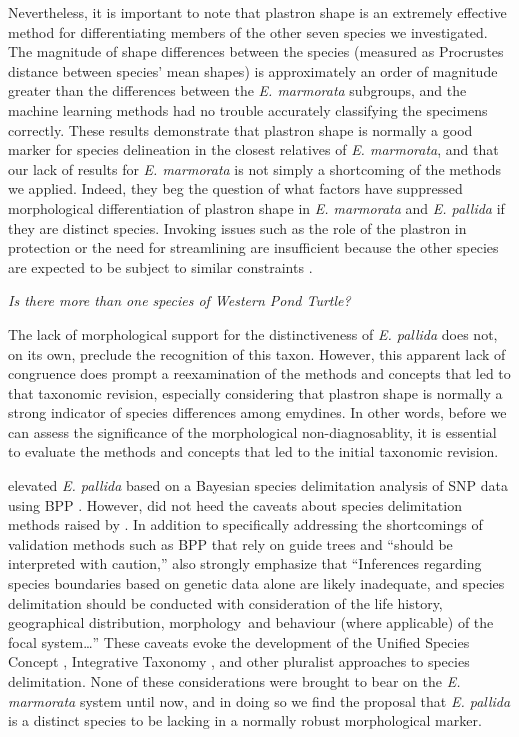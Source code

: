 \documentclass[12pt,letterpaper]{article}
\renewcommand{\subsection}[1]{%
\bigskip
\begin{center}
\begin{large}
\normalfont\itshape #1
\end{large}
\end{center}}
\begin{document}
Nevertheless, it is important to note that plastron shape is an extremely effective method for differentiating members of the other seven species we investigated. The magnitude of shape differences between the species (measured as Procrustes distance between species' mean shapes) is approximately an order of magnitude greater than the differences between the \textit{E. marmorata} subgroups, and the machine learning methods had no trouble accurately classifying the specimens correctly. These results demonstrate that plastron shape is normally a good marker for species delineation in the closest relatives of \textit{E. marmorata}, and that our lack of results for \textit{E. marmorata} is not simply a shortcoming of the methods we applied. Indeed, they beg the question of what factors have suppressed morphological differentiation of plastron shape in \textit{E. marmorata} and \textit{E. pallida} if they are distinct species. Invoking issues such as the role of the plastron in protection or the need for streamlining are insufficient because the other species are expected to be subject to similar constraints \citep{Stayton2011,Pollyb}. 

\subsection{Is there more than one species of Western Pond Turtle?}

The lack of morphological support for the distinctiveness of \textit{E. pallida} does not, on its own, preclude the recognition of this taxon. However, this apparent lack of congruence does prompt a reexamination of the methods and concepts that led to that taxonomic revision, especially considering that plastron shape is normally a strong indicator of species differences among emydines. In other words, before we can assess the significance of the morphological non-diagnosablity, it is essential to evaluate the methods and concepts that led to the initial taxonomic revision. 

\citet{Spinks2014} elevated \textit{E. pallida} based on a Bayesian species delimitation analysis of SNP data using BPP \citep{Yang2010b}. However, \citet{Spinks2014} did not heed the caveats about species delimitation methods raised by \citet{Carstens2013}. In addition to specifically addressing the shortcomings of validation methods such as BPP that rely on guide trees and ``should be interpreted with caution,'' \citet{Carstens2013} also strongly emphasize that ``Inferences regarding species boundaries based on genetic data alone are likely inadequate, and species delimitation should be conducted with consideration of the life history, geographical distribution, morphology and behaviour (where applicable) of the focal system\dots'' These caveats evoke the development of the Unified Species Concept \citep{Dayrat2005a,DeQueiroz2007b}, Integrative Taxonomy \citep{Padial2010}, and other pluralist approaches to species delimitation. None of these considerations were brought to bear on the \textit{E. marmorata} system until now, and in doing so we find the proposal that \textit{E. pallida} is a distinct species to be lacking in a normally robust morphological marker.
\end{document}
